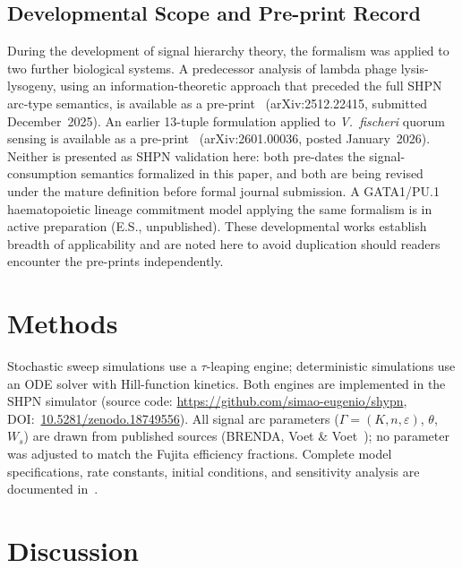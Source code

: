 \documentclass[10pt,letterpaper]{article}
\begin{document}
\subsection{Developmental Scope and Pre-print Record}
\label{sec:broader}

During the development of signal hierarchy theory, the formalism was applied to
two further biological systems. A predecessor analysis of lambda phage
lysis-lysogeny, using an information-theoretic approach that preceded the full
SHPN arc-type semantics, is available as a pre-print~\cite{simao2024hierarchical}
(arXiv:2512.22415, submitted December~2025). An earlier 13-tuple formulation
applied to \textit{V.\ fischeri} quorum sensing is available as a
pre-print~\cite{simao2025unifying} (arXiv:2601.00036, posted January~2026).
Neither is presented as SHPN validation here: both pre-dates the
signal-consumption semantics formalized in this paper, and both are being revised
under the mature definition before formal journal submission. A GATA1/PU.1
haematopoietic lineage commitment model applying the same formalism is in active
preparation (E.S., unpublished). These developmental works establish breadth of
applicability and are noted here to avoid duplication should readers encounter
the pre-prints independently.



\section{Methods}
\label{sec:methods}

Stochastic sweep simulations use a $\tau$-leaping engine; deterministic simulations use an ODE solver with Hill-function kinetics. Both engines are implemented in the SHPN simulator (source code: \url{https://github.com/simao-eugenio/shypn}, DOI:~\href{https://doi.org/10.5281/zenodo.18749556}{10.5281/zenodo.18749556}). All signal arc parameters ($\Gamma = (K, n, \varepsilon)$, $\theta$, $W_s$) are drawn from published sources (BRENDA, Voet \& Voet~\cite{voet2016}); no parameter was adjusted to match the Fujita efficiency fractions. Complete model specifications, rate constants, initial conditions, and sensitivity analysis are documented in~\cite{subtilis2026}.

\section{Discussion}
\label{sec:discussion}
\end{document}
